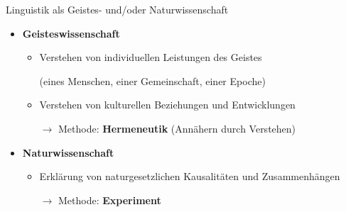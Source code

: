 \begin{frame}{Linguistik als Geistes- und/oder Naturwissenschaft}

	\begin{itemize}
		\item \textbf{Geisteswissenschaft}
		
		\begin{itemize}
			\item Verstehen von individuellen Leistungen des Geistes\par
				(eines Menschen, einer Gemeinschaft, einer Epoche)
			\item Verstehen von kulturellen Beziehungen und Entwicklungen
			\item[$\rightarrow$] Methode: \textbf{Hermeneutik} (Annähern durch Verstehen)
		\end{itemize}
		
		\item[]
		\item \textbf{Naturwissenschaft}
		
		\begin{itemize}
			\item Erklärung von naturgesetzlichen Kausalitäten und Zusammenhängen
			\item[$\rightarrow$] Methode: \textbf{Experiment}
		\end{itemize}
		
	\end{itemize}
	
\end{frame}		


